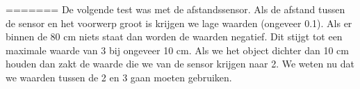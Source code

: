 \documentclass[a4paper,twoside,kulak]{kulakreport} %
\begin{document}
%
%
%
%
%
%
%
%
%
%
=======
De volgende test was met de afstandssensor. Als de afstand tussen de sensor en het voorwerp groot is krijgen we lage waarden (ongeveer 0.1). Als er binnen de 80 cm niets staat dan worden de waarden negatief. Dit stijgt tot een maximale waarde van 3 bij ongeveer 10 cm. Als we het object dichter dan 10 cm houden dan zakt de waarde die we van de sensor krijgen naar 2. We weten nu dat we waarden tussen de 2 en 3 gaan moeten gebruiken. 
\label{Experimenten}
\end{document}
